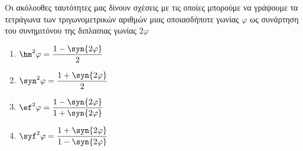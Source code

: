 \documentclass[twoside,nofonts,internet,shmeiwseis]{thewria}
\begin{document}
Οι ακόλουθες ταυτότητες μας δίνουν σχέσεις με τις οποίες μπορούμε να γράψουμε τα τετράγωνα των τριγωνομετρικών αριθμών μιας οποιασδήποτε γωνίας $ \varphi $ ως συνάρτηση του συνημιτόνου της διπλασιας γωνίας $ 2\varphi $
\begin{multicols}{2}
\begin{enumerate}
\item $ \hm^2{\varphi}=\dfrac{1-\syn{2\varphi}}{2} $
\item $ \syn^2{\varphi}=\dfrac{1+\syn{2\varphi}}{2} $
\item $ \ef^2{\varphi}=\dfrac{1-\syn{2\varphi}}{1+\syn{2\varphi}} $
\item $ \syf^2{\varphi}=\dfrac{1+\syn{2\varphi}}{1-\syn{2\varphi}} $
\end{enumerate}
\end{multicols}
\newpage
\noindent
\end{document}
